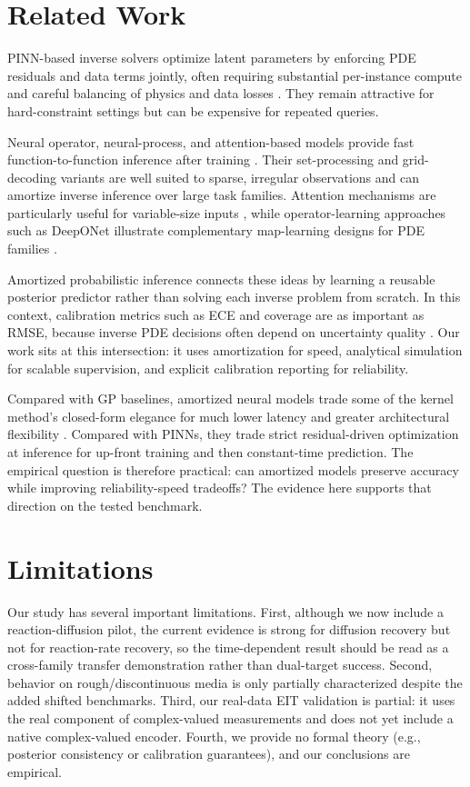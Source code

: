 \documentclass{article}
\begin{document}
\section{Related Work}
PINN-based inverse solvers optimize latent parameters by enforcing PDE residuals and data terms jointly, often requiring substantial per-instance compute and careful balancing of physics and data losses \cite{raissi2019pinn}. They remain attractive for hard-constraint settings but can be expensive for repeated queries.

Neural operator, neural-process, and attention-based models provide fast function-to-function inference after training \cite{li2021fno, kovachki2023neuralops, garnelo2018neural}. Their set-processing and grid-decoding variants are well suited to sparse, irregular observations and can amortize inverse inference over large task families. Attention mechanisms are particularly useful for variable-size inputs \cite{vaswani2017attention}, while operator-learning approaches such as DeepONet illustrate complementary map-learning designs for PDE families \cite{lu2021deeponet}.

Amortized probabilistic inference connects these ideas by learning a reusable posterior predictor rather than solving each inverse problem from scratch. In this context, calibration metrics such as ECE and coverage are as important as RMSE, because inverse PDE decisions often depend on uncertainty quality \cite{guo2017calibration}. Our work sits at this intersection: it uses amortization for speed, analytical simulation for scalable supervision, and explicit calibration reporting for reliability.

Compared with GP baselines, amortized neural models trade some of the kernel method's closed-form elegance for much lower latency and greater architectural flexibility \cite{rasmussen2006gp}. Compared with PINNs, they trade strict residual-driven optimization at inference for up-front training and then constant-time prediction. The empirical question is therefore practical: can amortized models preserve accuracy while improving reliability-speed tradeoffs? The evidence here supports that direction on the tested benchmark.

\section{Limitations}
Our study has several important limitations. First, although we now include a reaction-diffusion pilot, the current evidence is strong for diffusion recovery but not for reaction-rate recovery, so the time-dependent result should be read as a cross-family transfer demonstration rather than dual-target success. Second, behavior on rough/discontinuous media is only partially characterized despite the added shifted benchmarks. Third, our real-data EIT validation is partial: it uses the real component of complex-valued measurements and does not yet include a native complex-valued encoder. Fourth, we provide no formal theory (e.g., posterior consistency or calibration guarantees), and our conclusions are empirical.
\end{document}
